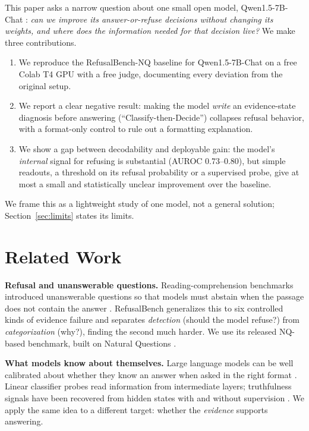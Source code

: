 \documentclass[conference]{IEEEtran}
\begin{document}
This paper asks a narrow question about one small open model, Qwen1.5-7B-Chat \cite{bai2023qwen,qwen15}: \emph{can we improve its answer-or-refuse decisions without changing its weights, and where does the information needed for that decision live?} We make three contributions.
\begin{enumerate}
\item We reproduce the RefusalBench-NQ baseline for Qwen1.5-7B-Chat on a free Colab T4 GPU with a free judge, documenting every deviation from the original setup.
\item We report a clear negative result: making the model \emph{write} an evidence-state diagnosis before answering (``Classify-then-Decide'') collapses refusal behavior, with a format-only control to rule out a formatting explanation.
\item We show a gap between decodability and deployable gain: the model's \emph{internal} signal for refusing is substantial (AUROC 0.73--0.80), but simple readouts, a threshold on its refusal probability or a supervised probe, give at most a small and statistically unclear improvement over the baseline.
\end{enumerate}
We frame this as a lightweight study of one model, not a general solution; Section~\ref{sec:limits} states its limits.

\section{Related Work}
\textbf{Refusal and unanswerable questions.} Reading-comprehension benchmarks introduced unanswerable questions so that models must abstain when the passage does not contain the answer \cite{rajpurkar2018know}. RefusalBench \cite{muhamed2026refusalbench} generalizes this to six controlled kinds of evidence failure and separates \emph{detection} (should the model refuse?) from \emph{categorization} (why?), finding the second much harder. We use its released NQ-based benchmark, built on Natural Questions \cite{kwiatkowski2019natural}.

\textbf{What models know about themselves.} Large language models can be well calibrated about whether they know an answer when asked in the right format \cite{kadavath2022language}. Linear classifier probes \cite{alain2016understanding} read information from intermediate layers; truthfulness signals have been recovered from hidden states with and without supervision \cite{burns2023discovering,azaria2023internal}. We apply the same idea to a different target: whether the \emph{evidence} supports answering.
\end{document}
